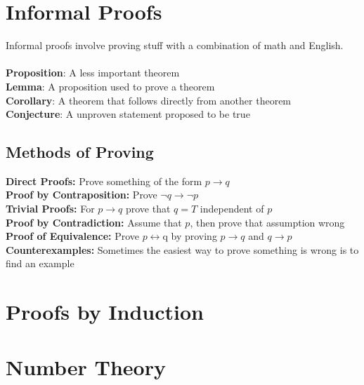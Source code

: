 \documentclass[letter]{article}
\begin{document}
\begin{multicols}{2}

	\section{Informal Proofs}
	Informal proofs involve proving stuff with a combination of math and English.\\\\

	\textbf{Proposition}: A less important theorem\\
	\textbf{Lemma}: A proposition used to prove a theorem\\
	\textbf{Corollary}: A theorem that follows directly from another theorem\\
	\textbf{Conjecture}: A unproven statement proposed to be true\\

	\subsection{Methods of Proving}
	\textbf{Direct Proofs:} Prove something of the form $p \rightarrow q$\\
	\textbf{Proof by Contraposition:} Prove $\neg q \rightarrow \neg p$\\
	\textbf{Trivial Proofs:} For $p \rightarrow q$ prove that $q = T$ independent of $p$\\
	\textbf{Proof by Contradiction:} Assume that $p$, then prove that assumption wrong\\
	\textbf{Proof of Equivalence:} Prove $p \leftrightarrow $q by proving $p \rightarrow q$ and $q \rightarrow p$\\
	\textbf{Counterexamples:} Sometimes the easiest way to prove something is wrong is to find an example\\

	\section{Proofs by Induction}

	\section{Number Theory}


\end{multicols}
\end{document}
